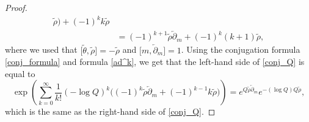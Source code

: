 \documentclass[pdftex]{sigma}
\numberwithin{equation}{section}
\begin{document}
\begin{proof}
\begin{align*}
\widetilde{\rho}\big) +(-1)^k k \widetilde{\rho}\\
&=
(-1)^{k+1} \widetilde{\rho} \overleftarrow{\partial}_m+
(-1)^{k} (k+1) \widetilde{\rho},
\end{align*}
where we used that
$\big[\widetilde{\theta},\widetilde{\rho}\big]=-\widetilde{\rho}$ and
$\big[m,\overleftarrow{\partial}_m\big]=1$.
Using the conjugation formula \eqref{conj_formula} and formula
\eqref{ad^k}, we get that the left-hand side of \eqref{conj_Q} is equal to
\[
\exp\left(
\sum_{k=0}^\infty \frac{1}{k!} (-\log Q)^k\big(
(-1)^{k} \widetilde{\rho} \overleftarrow{\partial}_m+
(-1)^{k-1} k \widetilde{\rho}\big)\right) =
e^{Q \widetilde{\rho} \overleftarrow{\partial}_m}
e^{-(\log Q) Q \widetilde{\rho}},
\]
which is the same as the right-hand side of \eqref{conj_Q}.
\end{proof}
\end{document}
